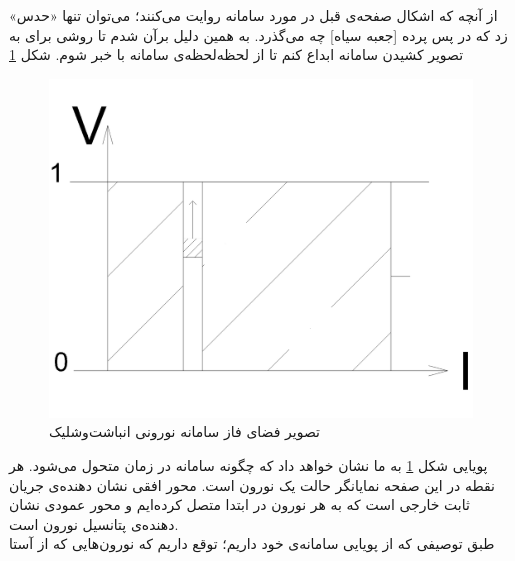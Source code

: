 از آنچه که اشکال صفحه‌ی قبل در مورد سامانه روایت می‌کنند؛ می‌توان تنها «حدس» زد که در پس پرده [جعبه سیاه] چه می‌گذرد. به همین دلیل برآن شدم تا روشی برای به تصویر کشیدن سامانه ابداع کنم تا از لحظه‌لحظه‌ی سامانه با خبر شوم. شکل \ref{fig:if_animation_plot}

\begin{figure}[h]
	\centering
	\includegraphics[width =\textwidth]{figs/IF/IF_phase_space-Model.png}
	\caption{تصویر فضای فاز سامانه نورونی انباشت‌وشلیک}
	\label{fig:if_animation_plot}
\end{figure}

پویایی شکل \ref{fig:if_animation_plot} به ما نشان خواهد داد که چگونه سامانه در زمان متحول می‌شود. هر نقطه در این صفحه نمایانگر حالت یک نورون است. محور افقی نشان دهنده‌ی جریان ثابت خارجی است که به هر نورون در ابتدا متصل کرده‌ایم و محور عمودی نشان دهنده‌ی پتانسیل نورون است.\\
طبق توصیفی که از پویایی سامانه‌ی خود داریم؛ توقع داریم که نورون‌هایی که از آستا